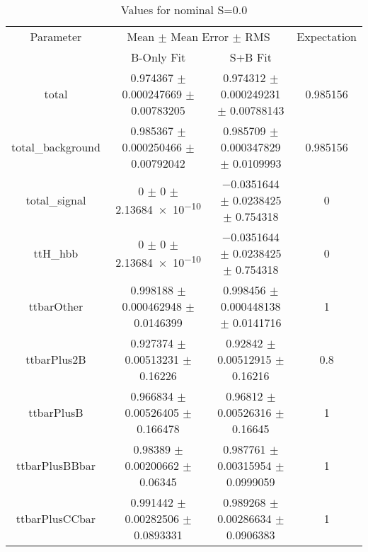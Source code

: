 \begin{table}
\centering
\caption{Values for nominal S=0.0}
\begin{tabular}{cccc}
\toprule
Parameter & \multicolumn{2}{c}{Mean $\pm$ Mean Error $\pm$ RMS} & Expectation\\
 & B-Only Fit & S+B Fit & \\
\midrule
total & \num{0.974367} $\pm$ \num{0.000247669} $\pm$ \num{0.00783205} & \num{0.974312} $\pm$ \num{0.000249231} $\pm$ \num{0.00788143} & \num{0.985156}\\
total\_background & \num{0.985367} $\pm$ \num{0.000250466} $\pm$ \num{0.00792042} & \num{0.985709} $\pm$ \num{0.000347829} $\pm$ \num{0.0109993} & \num{0.985156}\\
total\_signal & \num{0} $\pm$ \num{0} $\pm$ \num{2.13684e-10} & \num{-0.0351644} $\pm$ \num{0.0238425} $\pm$ \num{0.754318} & \num{0}\\
ttH\_hbb & \num{0} $\pm$ \num{0} $\pm$ \num{2.13684e-10} & \num{-0.0351644} $\pm$ \num{0.0238425} $\pm$ \num{0.754318} & \num{0}\\
ttbarOther & \num{0.998188} $\pm$ \num{0.000462948} $\pm$ \num{0.0146399} & \num{0.998456} $\pm$ \num{0.000448138} $\pm$ \num{0.0141716} & \num{1}\\
ttbarPlus2B & \num{0.927374} $\pm$ \num{0.00513231} $\pm$ \num{0.16226} & \num{0.92842} $\pm$ \num{0.00512915} $\pm$ \num{0.16216} & \num{0.8}\\
ttbarPlusB & \num{0.966834} $\pm$ \num{0.00526405} $\pm$ \num{0.166478} & \num{0.96812} $\pm$ \num{0.00526316} $\pm$ \num{0.16645} & \num{1}\\
ttbarPlusBBbar & \num{0.98389} $\pm$ \num{0.00200662} $\pm$ \num{0.06345} & \num{0.987761} $\pm$ \num{0.00315954} $\pm$ \num{0.0999059} & \num{1}\\
ttbarPlusCCbar & \num{0.991442} $\pm$ \num{0.00282506} $\pm$ \num{0.0893331} & \num{0.989268} $\pm$ \num{0.00286634} $\pm$ \num{0.0906383} & \num{1}\\
\bottomrule
\end{tabular}
\end{table}